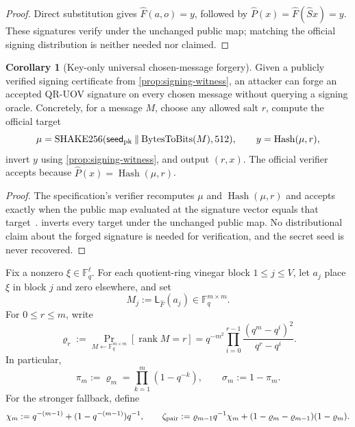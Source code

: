 \documentclass[11pt,a4paper]{article}
\theoremstyle{definition}
\newtheorem{corollary}[theorem]{Corollary}
\theoremstyle{remark}
\newcommand{\F}{\mathbb F}
\newcommand{\rank}{\operatorname{rank}}
\newcommand{\QRUOV}{\textsf{QR-UOV}}
\begin{document}
\begin{proof}
Direct substitution gives $\widehat F(a,o)=y$, followed by $\widehat P(x)=\widehat F(\widehat Sx)=y$.  These signatures verify under the unchanged public map; matching the official signing distribution is neither needed nor claimed.
\end{proof}

\begin{corollary}[Key-only universal chosen-message forgery]\label{cor:universal-forgery}
Given a publicly verified signing certificate from \cref{prop:signing-witness}, an attacker can forge an accepted \QRUOV{} signature on every chosen message without querying a signing oracle.  Concretely, for a message $M$, choose any allowed salt $r$, compute the official target
\[
 \mu=\operatorname{SHAKE256}(\mathsf{seed}_{\rm pk}\mathbin\|\operatorname{BytesToBits}(M),512),
 \qquad y=\operatorname{Hash}(\mu,r),
\]
invert $y$ using \cref{prop:signing-witness}, and output $(r,x)$.  The official verifier accepts because $\widehat P(x)=\operatorname{Hash}(\mu,r)$.
\end{corollary}

\begin{proof}
The specification's verifier recomputes $\mu$ and $\operatorname{Hash}(\mu,r)$ and accepts exactly when the public map evaluated at the signature vector equals that target~\cite[Secs.~4.2--4.3]{QRUOVSpec}.   inverts every target under the unchanged public map.  No distributional claim about the forged signature is needed for verification, and the secret seed is never recovered.
\end{proof}

Fix a nonzero $\xi\in\F_q^\ell$.  For each quotient-ring vinegar block $1\le j\le V$, let $a_j$ place $\xi$ in block $j$ and zero elsewhere, and set
\[
M_j:=\mathsf L_{\widehat F}(a_j)\in\F_q^{m\times m}.
\]
For $0\le r\le m$, write
\begin{equation}\label{eq:rank-probability}
\varrho_r:=\Pr_{M\leftarrow\F_q^{m\times m}}[\rank M=r]
=q^{-m^2}\prod_{i=0}^{r-1}\frac{(q^m-q^i)^2}{q^r-q^i}.
\end{equation}
In particular,
\begin{equation}\label{eq:square-invertible}
 \pi_m:=\varrho_m=\prod_{k=1}^m(1-q^{-k}),
 \qquad \sigma_m:=1-\pi_m.
\end{equation}
For the stronger fallback, define
\begin{equation}\label{eq:pair-failure}
\chi_m:=q^{-(m-1)}+(1-q^{-(m-1)})q^{-1},
\qquad
\zeta_{\rm pair}:=
\varrho_{m-1}q^{-1}\chi_m
+(1-\varrho_m-\varrho_{m-1})(1-\varrho_m).
\end{equation}
\end{document}
